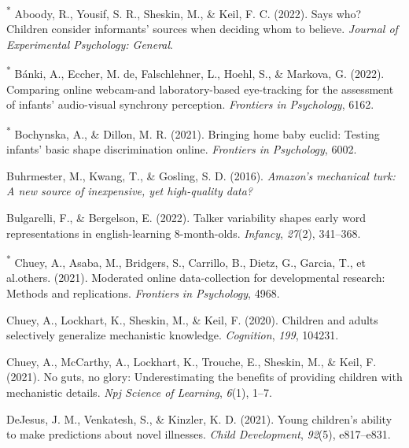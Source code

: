 \documentclass[
  man,floatsintext]{apa6}
\newlength{\cslhangindent}
\newlength{\cslentryspacingunit} %
\newenvironment{CSLReferences}[2] %
 {%
  \setlength{\parindent}{0pt}
  \ifodd #1
  \let\oldpar\par
  \def\par{\hangindent=\cslhangindent\oldpar}
  \fi
  \setlength{\parskip}{#2\cslentryspacingunit}
 }%
 {}
\begin{document}
\hypertarget{refs}{}
\begin{CSLReferences}{1}{0}
\leavevmode{}%
\textsuperscript{*} Aboody, R., Yousif, S. R., Sheskin, M., \& Keil, F. C. (2022). Says who? Children consider informants' sources when deciding whom to believe. \emph{Journal of Experimental Psychology: General}.

\leavevmode{}%
\textsuperscript{*} Bánki, A., Eccher, M. de, Falschlehner, L., Hoehl, S., \& Markova, G. (2022). Comparing online webcam-and laboratory-based eye-tracking for the assessment of infants' audio-visual synchrony perception. \emph{Frontiers in Psychology}, 6162.

\leavevmode{}%
\textsuperscript{*} Bochynska, A., \& Dillon, M. R. (2021). Bringing home baby euclid: Testing infants' basic shape discrimination online. \emph{Frontiers in Psychology}, 6002.

\leavevmode{}%
Buhrmester, M., Kwang, T., \& Gosling, S. D. (2016). \emph{Amazon's mechanical turk: A new source of inexpensive, yet high-quality data?}

\leavevmode{}%
Bulgarelli, F., \& Bergelson, E. (2022). Talker variability shapes early word representations in english-learning 8-month-olds. \emph{Infancy}, \emph{27}(2), 341--368.

\leavevmode{}%
\textsuperscript{*} Chuey, A., Asaba, M., Bridgers, S., Carrillo, B., Dietz, G., Garcia, T., et al.others. (2021). Moderated online data-collection for developmental research: Methods and replications. \emph{Frontiers in Psychology}, 4968.

\leavevmode{}%
Chuey, A., Lockhart, K., Sheskin, M., \& Keil, F. (2020). Children and adults selectively generalize mechanistic knowledge. \emph{Cognition}, \emph{199}, 104231.

\leavevmode{}%
Chuey, A., McCarthy, A., Lockhart, K., Trouche, E., Sheskin, M., \& Keil, F. (2021). No guts, no glory: Underestimating the benefits of providing children with mechanistic details. \emph{Npj Science of Learning}, \emph{6}(1), 1--7.

\leavevmode{}%
DeJesus, J. M., Venkatesh, S., \& Kinzler, K. D. (2021). Young children's ability to make predictions about novel illnesses. \emph{Child Development}, \emph{92}(5), e817--e831.


\end{CSLReferences}
\end{document}
